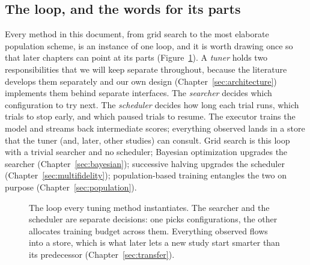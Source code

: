 \subsection{The loop, and the words for its parts}

Every method in this document, from grid search to the most elaborate
population scheme, is an instance of one loop, and it is worth drawing once
so that later chapters can point at its parts
(Figure~\ref{fig:loop}). A \emph{tuner} holds two responsibilities that we
will keep separate throughout, because the literature develops them
separately and our own design (Chapter~\ref{sec:architecture}) implements
them behind separate interfaces. The \emph{searcher} decides which
configuration to try next. The \emph{scheduler} decides how long each trial
runs, which trials to stop early, and which paused trials to resume. The
executor trains the model and streams back intermediate scores; everything
observed lands in a store that the tuner (and, later, other studies) can
consult. Grid search is this loop with a trivial searcher and no scheduler;
Bayesian optimization upgrades the searcher
(Chapter~\ref{sec:bayesian}); successive halving upgrades the scheduler
(Chapter~\ref{sec:multifidelity}); population-based training entangles the
two on purpose (Chapter~\ref{sec:population}).

\begin{figure}[t]
\centering
{}
\caption{The loop every tuning method instantiates. The searcher and the
scheduler are separate decisions: one picks configurations, the other
allocates training budget across them. Everything observed flows into a
store, which is what later lets a new study start smarter than its
predecessor (Chapter~\ref{sec:transfer}).}
\label{fig:loop}
\end{figure}

